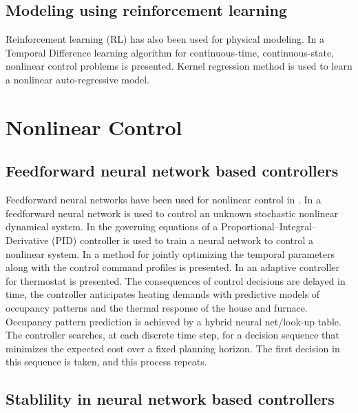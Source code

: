 \documentclass[conference]{IEEEtran}
\begin{document}
\subsection{\textbf{Modeling using reinforcement learning}}

Reinforcement learning (RL) has also been used for physical modeling. In \cite{doya1996nips} a Temporal Difference learning algorithm for continuous-time, continuous-state, nonlinear control problems is presented. Kernel regression method is used to learn a nonlinear auto-regressive model.  \\

\section{Nonlinear Control}

\subsection{\textbf{Feedforward neural network based controllers}}

Feedforward neural networks have been used for nonlinear control in \cite{milito1991nips, scott1992nips, rawlik2010nips, Mozer1996TheNP, chen2002ICDC, yu1996nips}. In \cite{milito1991nips} a feedforward neural network is used to control an unknown stochastic nonlinear dynamical system. In \cite{scott1992nips} the governing equations of a Proportional–Integral–Derivative (PID) controller is used to train a neural network to control a nonlinear system. In \cite{rawlik2010nips} a method for jointly optimizing the temporal parameters along with the control command profiles is presented. In \cite{Mozer1996TheNP} an adaptive controller for thermostat is presented. The consequences of control decisions are delayed in time, the controller anticipates heating demands with predictive models of occupancy patterns and the thermal response of the house and furnace. Occupancy pattern prediction is achieved by a hybrid neural net/look-up table. The controller searches, at each discrete time step, for a decision sequence that minimizes the expected cost over a fixed planning horizon. The first decision in this sequence is taken, and this process repeats.

\subsection{\textbf{Stablility in neural network based controllers}}
\end{document}
